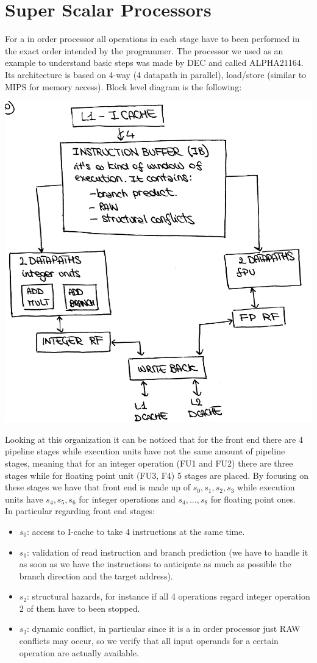 \section{Super Scalar Processors}

For a  in order processor all operations in each stage have to been performed
in the exact order intended by the programmer. The processor we used as an
example to understand basic steps was made by DEC and called ALPHA21164. Its
architecture is based on 4-way (4 datapath in parallel), load/store (similar to
MIPS for memory access). Block level diagram is the following:

\begin{center}
  \includegraphics[width=0.7\linewidth]{img/img3/10}
\end{center}

Looking at this organization it can be noticed that for the front end there are
4 pipeline stages while execution units have not the same amount of pipeline
stages, meaning that for an integer operation (FU1 and FU2) there are three
stages while for floating point unit (FU3, F4)  5 stages are placed. By
focusing on these stages we have that front end is made up of $s_0,s_1,s_2, s_3$
while execution units have $s_4,s_5,s_6$ for integer operations and
$s_4,...,s_8$ for floating point ones.\\

In particular regarding front end stages:

\begin{itemize}
  \item $s_0$: access to I-cache to take 4 instructions at the same time.
  \item $s_1$: validation of read instruction and branch prediction (we have
  to handle it as soon as we have the instructions to anticipate as much as
  possible the branch direction and the target address).
  \item $s_2$: structural hazards, for instance if all 4 operations regard
  integer operation 2 of them have to been stopped.
  \item $s_3$: dynamic conflict, in particular since it is a in order
  processor just RAW conflicts may occur, so we verify that all input
  operands for a certain operation are actually available.
\end{itemize}

